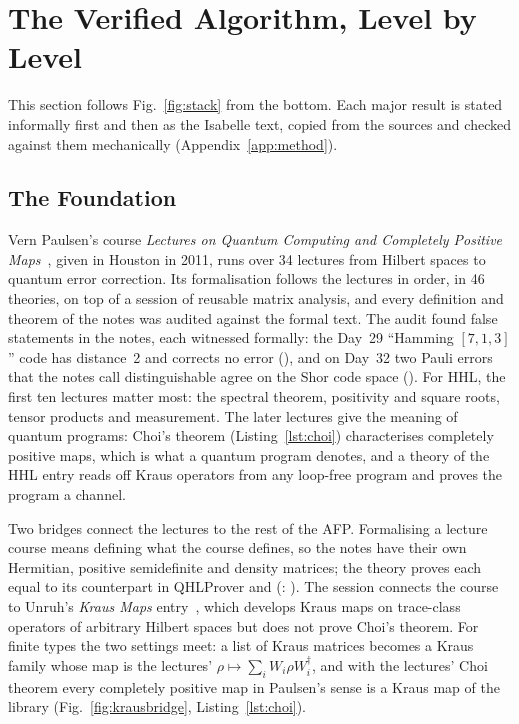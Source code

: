 \section{The Verified Algorithm, Level by Level}\label{sec:results}

This section follows Fig.~\ref{fig:stack} from the bottom. Each major result is stated informally
first and then as the Isabelle text, copied from the sources and checked against them
mechanically (Appendix~\ref{app:method}).

\subsection{The Foundation}\label{sec:foundation}

Vern Paulsen's course \emph{Lectures on Quantum Computing and Completely Positive
Maps}~\cite{paulsen2011notes}, given in Houston in 2011, runs over 34 lectures from Hilbert spaces to
quantum error correction. Its formalisation follows the lectures in order, in 46 theories, on top of
a session of reusable matrix analysis, and every definition and theorem of the notes was audited
against the formal text. The audit found false statements in the notes, each witnessed formally:
the Day~29 ``Hamming $[7,1,3]$'' code has distance~2 and corrects no error
(), and on Day~32 two Pauli errors that the notes call
distinguishable agree on the Shor code space (). For HHL, the first ten
lectures matter most: the spectral theorem, positivity and square roots, tensor products and
measurement. The later lectures give the meaning of quantum programs: Choi's theorem
(Listing~\ref{lst:choi}) characterises completely positive maps, which is what a quantum program
denotes, and a theory of the HHL entry reads off Kraus operators from any loop-free program and proves
the program a channel.

Two bridges connect the lectures to the rest of the AFP. Formalising a lecture course means
defining what the course defines, so the notes have their own Hermitian, positive semidefinite and
density matrices; the theory  proves each equal to its counterpart in
QHLProver and \IMD{} (: ). The session
 connects the course to Unruh's \emph{Kraus Maps}
entry~\cite{unruh2025kraus}, which develops Kraus maps on trace-class operators of arbitrary Hilbert
spaces but does not prove Choi's theorem. For finite types the two settings meet: a list of Kraus
matrices becomes a Kraus family whose map is the lectures' $\rho\mapsto\sum_iW_i\rho W_i^\dagger$, and
with the lectures' Choi theorem every completely positive map in Paulsen's sense is a Kraus map of the
library (Fig.~\ref{fig:krausbridge}, Listing~\ref{lst:choi}).

